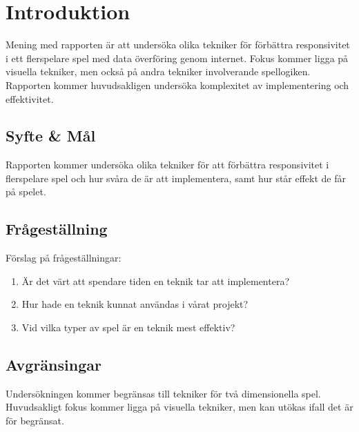 \section{Introduktion}
\label{sec:bjorn-introduction}
Mening med rapporten är att undersöka olika tekniker för förbättra responsivitet i ett flerspelare spel med data överföring genom internet. Fokus kommer ligga på visuella tekniker, men också på andra tekniker involverande spellogiken. Rapporten kommer huvudsakligen undersöka komplexitet av implementering och effektivitet.

\subsection{Syfte \& Mål}
\label{subsec:motivation}

Rapporten kommer undersöka olika tekniker för att förbättra responsivitet i flerspelare spel och hur svåra de är att implementera, samt hur står effekt de får på spelet.

\subsection{Frågeställning}
\label{subsec:research-questions}

Förslag på frågeställningar:

\begin{enumerate}
\item Är det värt att spendare tiden en teknik tar att implementera?

\item Hur hade en teknik kunnat användas i vårat projekt?

\item Vid vilka typer av spel är en teknik mest effektiv?


\end{enumerate}


\subsection{Avgränsingar}
\label{subsec:delimitations}

Undersökningen kommer begränsas till tekniker för två dimensionella spel. Huvudsakligt fokus kommer ligga på visuella tekniker, men kan utökas ifall det är för begränsat.